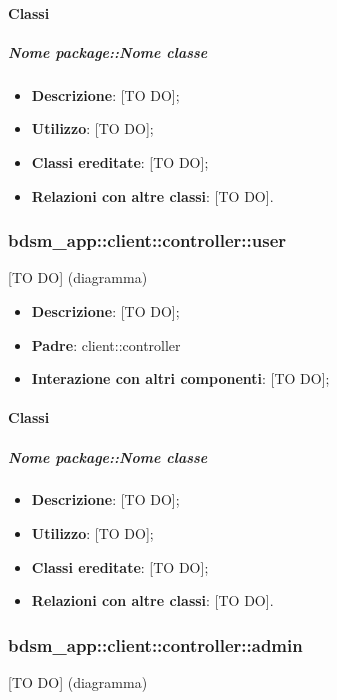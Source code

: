 	\paragraph{Classi} %
		\subparagraph{Nome package::Nome classe} %
		\label{subp:subparagraph_name}
			\begin{itemize}
				\item \textbf{Descrizione}: [TO DO];
				\item \textbf{Utilizzo}: [TO DO];
				\item \textbf{Classi ereditate}: [TO DO];
				\item \textbf{Relazioni con altre classi}: [TO DO].
			\end{itemize}



\subsubsection{bdsm\_app::client::controller::user} %
\label{ssub:bdsm_app_client_controller_user}
[TO DO] (diagramma) \newline \newline

\begin{itemize}
	\item \textbf{Descrizione}: [TO DO];
	\item \textbf{Padre}: client::controller
	\item \textbf{Interazione con altri componenti}: [TO DO];
\end{itemize}

	\paragraph{Classi} %
		\subparagraph{Nome package::Nome classe} %
		\label{subp:subparagraph_name}
			\begin{itemize}
				\item \textbf{Descrizione}: [TO DO];
				\item \textbf{Utilizzo}: [TO DO];
				\item \textbf{Classi ereditate}: [TO DO];
				\item \textbf{Relazioni con altre classi}: [TO DO].
			\end{itemize}

\subsubsection{bdsm\_app::client::controller::admin} %
\label{ssub:bdsm_app_client_controller_admin}
[TO DO] (diagramma) \newline \newline

